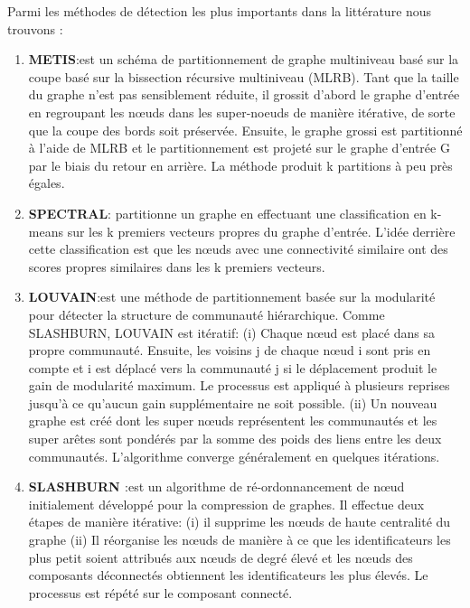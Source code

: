 			Parmi les méthodes de détection les plus importants dans la littérature nous trouvons :
			\begin{enumerate}
				\item \textbf{METIS\citep{karypis2000multilevel}}:est un schéma de partitionnement de graphe multiniveau basé sur la coupe basé sur la bissection récursive multiniveau (MLRB). Tant que la taille du graphe n'est pas sensiblement réduite, il grossit d'abord le graphe d'entrée en regroupant les nœuds dans les super-noeuds de manière itérative, de sorte que la coupe des bords soit préservée. Ensuite, le graphe grossi est partitionné à l'aide de MLRB et le partitionnement est projeté sur le graphe d'entrée G par le biais du retour en arrière. La méthode produit k partitions à peu près égales.
				\item \textbf{SPECTRAL\citep{hespanha2004efficient}}: partitionne un graphe en effectuant une classification en k-means sur les k premiers vecteurs propres du graphe d'entrée. L'idée derrière cette classification est que les nœuds avec une connectivité similaire ont des scores propres similaires dans les k premiers vecteurs.
				\item \textbf{LOUVAIN\citep{blondel2008fast}}:est une méthode de partitionnement basée sur la modularité pour détecter la structure de communauté hiérarchique. Comme SLASHBURN, LOUVAIN est itératif: (i) Chaque nœud est placé dans sa propre communauté. Ensuite, les voisins j de chaque nœud i sont pris en compte et i est déplacé vers la communauté j si le déplacement produit le gain de modularité maximum. Le processus est appliqué à plusieurs reprises jusqu'à ce qu'aucun gain supplémentaire ne soit possible. (ii) Un nouveau graphe est créé dont les super nœuds représentent les communautés et les super arêtes sont pondérés par la somme des poids des liens entre les deux communautés. L'algorithme converge généralement en quelques itérations.
				\item \textbf{SLASHBURN \citep{kang2011beyond}}:est un algorithme de ré-ordonnancement de nœud initialement développé pour la compression de graphes. Il effectue deux étapes de manière itérative: (i) il supprime les nœuds de haute centralité du graphe (ii) Il réorganise les nœuds de manière à ce que les identificateurs les plus petit soient attribués aux nœuds de degré élevé et les nœuds des composants déconnectés obtiennent les identificateurs les plus élevés. Le processus est répété sur le composant connecté.

\end{enumerate}
